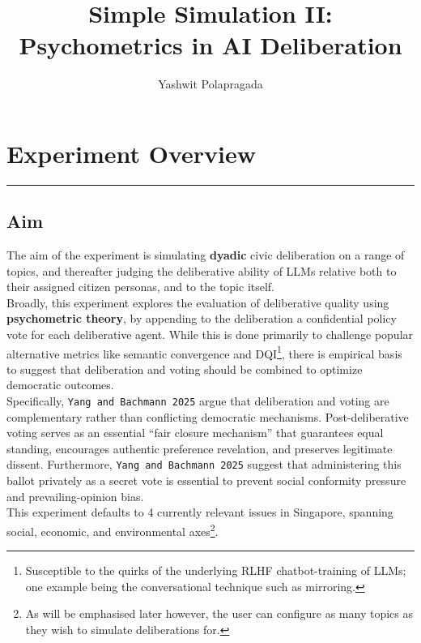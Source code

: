 \documentclass[titlepage]{article}
\title{Simple Simulation II: Psychometrics in AI Deliberation}
\author{Yashwit Polapragada}
\begin{document}
\maketitle

\tableofcontents

\newpage

\section{Experiment Overview}
\label{sec:taskdescription}
\rule{\textwidth}{0.4pt}

\subsection{Aim}
The aim of the experiment is simulating \textbf{dyadic} civic deliberation on a range of topics, and thereafter judging the deliberative ability of LLMs relative both to their assigned citizen personas, and to the topic itself.\\

Broadly, this experiment explores the evaluation of deliberative quality using \textbf{psychometric theory}, by appending to the deliberation a confidential policy vote for each deliberative agent. While this is done primarily to challenge popular alternative metrics like semantic convergence and DQI\footnote{Susceptible to the quirks of the underlying RLHF chatbot-training of LLMs; one example being the conversational technique such as mirroring.}, there is empirical basis to suggest that deliberation and voting should be combined to optimize democratic outcomes.\\

Specifically, \texttt{Yang and Bachmann 2025} argue that deliberation and voting are complementary rather than conflicting democratic mechanisms. Post-deliberative voting serves as an essential ``fair closure mechanism'' that guarantees equal standing, encourages authentic preference revelation, and preserves legitimate dissent. Furthermore, \texttt{Yang and Bachmann 2025} suggest that administering this ballot privately as a secret vote is essential to prevent social conformity pressure and prevailing-opinion bias.\\

This experiment defaults to 4 currently relevant issues in Singapore, spanning social, economic, and environmental axes\footnote{As will be emphasised later however, the user can configure as many topics as they wish to simulate deliberations for.}.
\end{document}

